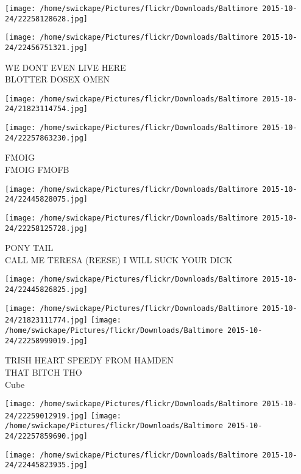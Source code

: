 \documentclass[10pt,letterpaper]{article}
\begin{document}
\texttt{[image: /home/swickape/Pictures/flickr/Downloads/Baltimore 2015-10-24/22258128628.jpg]}

\vspace{0.25in}
\texttt{[image: /home/swickape/Pictures/flickr/Downloads/Baltimore 2015-10-24/22456751321.jpg]}

WE DONT EVEN LIVE HERE\\
BLOTTER DOSEX OMEN
\pagebreak

\texttt{[image: /home/swickape/Pictures/flickr/Downloads/Baltimore 2015-10-24/21823114754.jpg]}

\vspace{0.25in}
\texttt{[image: /home/swickape/Pictures/flickr/Downloads/Baltimore 2015-10-24/22257863230.jpg]}

FMOIG\\
FMOIG FMOFB
\pagebreak

\texttt{[image: /home/swickape/Pictures/flickr/Downloads/Baltimore 2015-10-24/22445828075.jpg]}

\vspace{0.25in}
\texttt{[image: /home/swickape/Pictures/flickr/Downloads/Baltimore 2015-10-24/22258125728.jpg]}

PONY TAIL\\
CALL ME TERESA (REESE) I WILL SUCK YOUR DICK
\pagebreak

\texttt{[image: /home/swickape/Pictures/flickr/Downloads/Baltimore 2015-10-24/22445826825.jpg]}

\vspace{0.25in}
\texttt{[image: /home/swickape/Pictures/flickr/Downloads/Baltimore 2015-10-24/21823111774.jpg]}
\texttt{[image: /home/swickape/Pictures/flickr/Downloads/Baltimore 2015-10-24/22258999019.jpg]}

TRISH HEART SPEEDY FROM HAMDEN\\
THAT BITCH THO\\
Cube
\pagebreak

\texttt{[image: /home/swickape/Pictures/flickr/Downloads/Baltimore 2015-10-24/22259012919.jpg]}
\texttt{[image: /home/swickape/Pictures/flickr/Downloads/Baltimore 2015-10-24/22257859690.jpg]}

\vspace{0.25in}
\texttt{[image: /home/swickape/Pictures/flickr/Downloads/Baltimore 2015-10-24/22445823935.jpg]}
\end{document}
